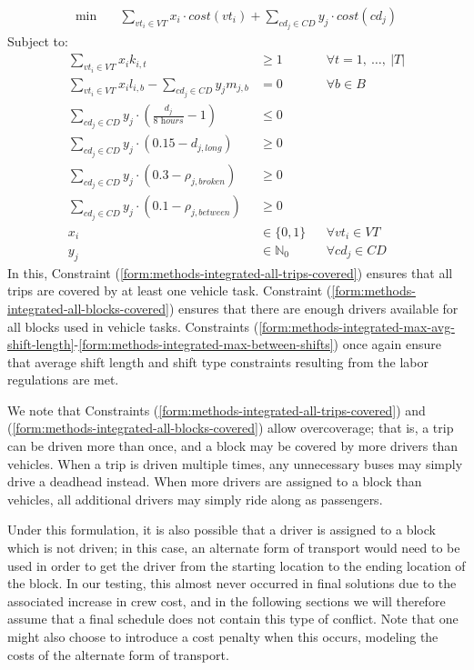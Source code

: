 \documentclass[]{article}
\begin{document}
\begin{align}
\min \quad
& \sum_{vt_i \in VT} x_{i} \cdot cost(vt_i) + \sum_{cd_j \in CD} y_{j} \cdot cost(cd_j)  
\end{align}
Subject to:
\begin{align}
\sum_{vt_i \in VT} x_{i}k_{i,t} &\geq 1 && \forall t = 1,\:\dots,\:|T| \label{form:methods-integrated-all-trips-covered} \\
\sum_{vt_i \in VT}x_i l_{i,b} - \sum_{cd_j \in CD}y_j m_{j,b} &= 0 && \forall b \in B \label{form:methods-integrated-all-blocks-covered} \\
\sum_{cd_j \in \textit{CD}} y_{j} \cdot (\frac{d_{j}}{\textit{8 hours}} - 1) &\leq 0 && \label{form:methods-integrated-max-avg-shift-length}\\
\sum_{cd_j \in \textit{CD}} y_{j} \cdot (0.15 - d_{j,\textit{long}}) &\geq 0 && \label{form:methods-integrated-max-long-shifts}\\
\sum_{cd_j \in \textit{CD}} y_{j} \cdot (0.3 - \rho_{j,\textit{broken}}) &\geq 0 && \label{form:methods-integrated-max-broken-shifts}\\
\sum_{cd_j \in \textit{CD}} y_{j} \cdot (0.1 - \rho_{j,\textit{between}}) &\geq 0 && \label{form:methods-integrated-max-between-shifts}\\
x_{i} &\in \{ 0, 1 \} && \forall vt_i \in VT \\
y_{j} &\in \mathbb{N}_0 && \forall cd_j \in CD
\end{align}
In this, Constraint (\ref{form:methods-integrated-all-trips-covered}) ensures that all trips are covered by at least one vehicle task. Constraint (\ref{form:methods-integrated-all-blocks-covered}) ensures that there are enough drivers available for all blocks used in vehicle tasks. Constraints (\ref{form:methods-integrated-max-avg-shift-length}-\ref{form:methods-integrated-max-between-shifts}) once again ensure that average shift length and shift type constraints resulting from the labor regulations are met.

We note that Constraints (\ref{form:methods-integrated-all-trips-covered}) and (\ref{form:methods-integrated-all-blocks-covered}) allow overcoverage; that is, a trip can be driven more than once, and a block may be covered by more drivers than vehicles. When a trip is driven multiple times, any unnecessary buses may simply drive a deadhead instead. When more drivers are assigned to a block than vehicles, all additional drivers may simply ride along as passengers. 

Under this formulation, it is also possible that a driver is assigned to a block which is not driven; in this case, an alternate form of transport would need to be used in order to get the driver from the starting location to the ending location of the block. In our testing, this almost never occurred in final solutions due to the associated increase in crew cost, and in the following sections we will therefore assume that a final schedule does not contain this type of conflict. Note that one might also choose to introduce a cost penalty when this occurs, modeling the costs of the alternate form of transport.
\end{document}
